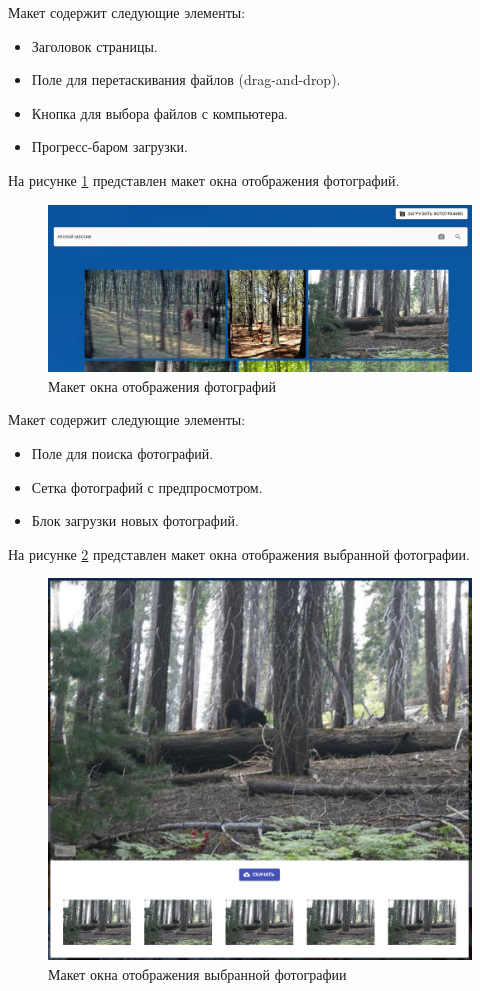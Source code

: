 Макет содержит следующие элементы:
\begin{itemize}
	\item Заголовок страницы.
	\item Поле для перетаскивания файлов (drag-and-drop).
	\item Кнопка для выбора файлов с компьютера.
	\item Прогресс-баром загрузки.
\end{itemize}

На рисунке \ref{fig:galleryPage} представлен макет окна отображения фотографий.
\begin{figure}
	\centering
	\includegraphics[width=0.95\linewidth]{"images/Окно отображения фотографий"}
	\caption{Макет окна отображения фотографий}
	\label{fig:galleryPage}
\end{figure}

Макет содержит следующие элементы:
\begin{itemize}
	\item Поле для поиска фотографий.
	\item Сетка фотографий с предпросмотром.
	\item Блок загрузки новых фотографий.
\end{itemize}

На рисунке \ref{fig:photoPage} представлен макет окна отображения выбранной фотографии.

\begin{figure}
	\centering
	\includegraphics[width=0.95\linewidth]{"images/Окно отображения выбранной фотографии"}
	\caption{Макет окна отображения выбранной фотографии}
	\label{fig:photoPage}
\end{figure}

